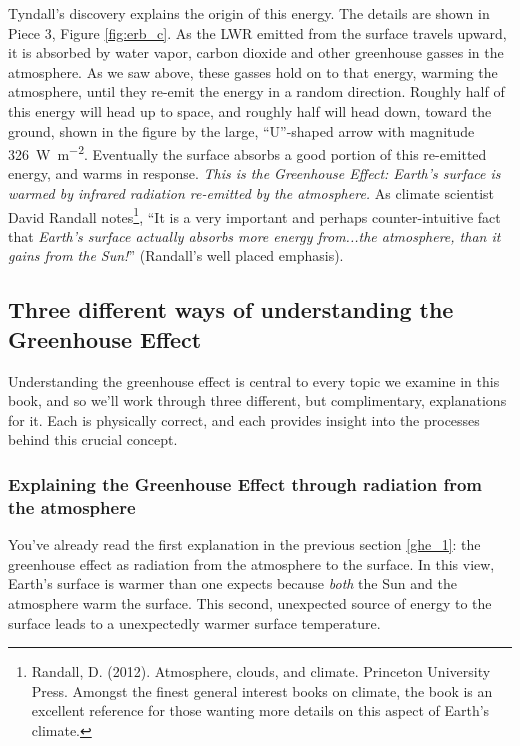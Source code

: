 Tyndall's discovery explains the origin of this energy. The details are shown in Piece 3, Figure \ref{fig:erb_c}. As the LWR emitted from the surface travels upward, it is absorbed by water vapor, carbon dioxide and other greenhouse gasses in the atmosphere. As we saw above, these gasses hold on to that energy, warming the atmosphere, until they re-emit the energy in a random direction. Roughly half of this energy will head up to space, and roughly half will head down, toward the ground, shown in the figure by the large, ``U''-shaped arrow with magnitude \SI{326}{\watt\per\m^{2}}. Eventually the surface absorbs a good portion of this re-emitted energy, and warms in response. \emph{This is the Greenhouse Effect: Earth's surface is warmed by infrared radiation re-emitted by the atmosphere.} As climate scientist David Randall notes\footnote{Randall, D. (2012). Atmosphere, clouds, and climate. Princeton University Press. Amongst the finest general interest books on climate, the book is an excellent reference for those wanting more details on this aspect of Earth's climate.}, ``It is a very important and perhaps counter-intuitive fact that \textit{Earth's surface actually absorbs more energy from...the atmosphere, than it gains from the Sun!}'' (Randall's well placed emphasis).

\subsection{Three different ways of understanding the Greenhouse Effect}
Understanding the greenhouse effect is central to every topic we examine in this book, and so we'll work through three different, but complimentary, explanations for it. Each is physically correct, and each provides insight into the processes behind this crucial concept.
\subsubsection{Explaining the Greenhouse Effect through radiation from the atmosphere}
You've already read the first explanation in the previous section \ref{ghe_1}: the greenhouse effect as radiation from the atmosphere to the surface. In this view, Earth's surface is warmer than one expects because \emph{both} the Sun and the atmosphere warm the surface. This second, unexpected source of energy to the surface leads to a unexpectedly warmer surface temperature. 
